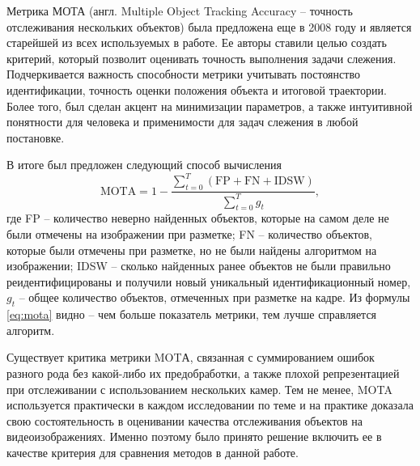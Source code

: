 Метрика МОТА\cite{bernardin2008evaluating} (англ. Multiple Object Tracking Accuracy -- точность отслеживания нескольких объектов) была предложена еще в 2008 году и является старейшей из всех используемых в работе. 
Ее авторы ставили целью создать критерий, который позволит оценивать точность выполнения задачи слежения. 
Подчеркивается важность способности метрики учитывать постоянство идентификации, точность оценки положения объекта и итоговой траектории.
Более того, был сделан акцент на минимизации параметров, а также интуитивной понятности для человека и применимости для задач слежения в любой постановке.

В итоге был предложен следующий способ вычисления 
\begin{equation}
    \text{MOTA} = 1 - \frac{\sum_{t=0}^{T}(\text{FP} + \text{FN} + \text{IDSW})}{\sum_{t=0}^{T}g_t},
    \label{eq:mota}
\end{equation}
где FP -- количество неверно найденных объектов, которые на самом деле не были отмечены на изображении при разметке; FN -- количество объектов, которые были отмечены при разметке, но не были найдены алгоритмом на изображении; 
IDSW -- сколько найденных ранее объектов не были правильно реидентифицированы и получили новый уникальный идентификационный номер, \(g_t\) -- общее количество объектов, отмеченных при разметке на кадре.
Из формулы \ref{eq:mota} видно -- чем больше показатель метрики, тем лучше справляется алгоритм.

Существует критика метрики MOTА, связанная с суммированием ошибок разного рода без какой-либо их предобработки, %
а также плохой репрезентацией при отслеживании с использованием нескольких камер. %
Тем не менее, MOTA используется практически в каждом исследовании по теме и на практике доказала свою состоятельность в оценивании качества отслеживания объектов на видеоизображениях. Именно поэтому было принято решение включить ее в качестве критерия для сравнения методов в данной работе.